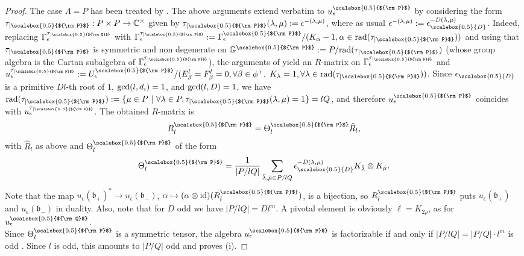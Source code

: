 \documentclass[11pt]{amsart}
\newcommand{\e}{\epsilon}
\newcommand{\mc}{\mathbb{C}}
\newcommand{\eD}{\epsilon_{\scalebox{0.5}{D}}}
\newcommand{\Q}{{\scalebox{0.5}{${\rm Q}$}}}
\newcommand{\Pup}{{\scalebox{0.5}{${\rm P}$}}}
\begin{document}
\begin{proof}
The case $\Lambda=P$ has been treated by \cite{LN,LO}. The above arguments extend verbatim to $u_\e^{\Pup}$ by considering the form $\tau_{\vert \Pup}:P \times P \to \mc^\times$ given by $\tau_{\vert \Pup}(\lambda,\mu) := \e^{-(\lambda, \mu)}$, where as usual $\e^{-(\lambda,\mu)} := \eD^{-D(\lambda,\mu)}$. Indeed, replacing $\Gamma_\e^{\tau_{\vert \Q}}$  with $\Gamma_\e^{\tau_{\vert \Pup}} := \Gamma_\e^\Pup/(K_\alpha-1,\alpha\in {\rm rad}(\tau_{\vert \Pup}))$ and using that $\tau_{\vert \Pup}$ is symmetric and non degenerate on $\mathbb{G}^\Pup:= P/{\rm rad}(\tau_{\vert \Pup})$ (whose group algebra is the Cartan subalgebra of $\Gamma_\e^{\tau_{\vert \Pup}}$), the arguments of \cite[Thm.\,A.1.6]{Lyub95} yield an $R$-matrix on $\Gamma_\e^{\tau_{\vert \Pup}}$ and $u_\e^{\tau_{\vert \Pup}} := U_\e^\Pup/(E_{\beta}^l=F_{\beta}^l=0, \forall \beta\in \phi^+, \;K_\lambda=1, \forall \lambda\in {\rm rad}(\tau_{\vert \Pup}))$. Since $\eD$ is a primitive $Dl$-th root of $1$, ${\rm gcd}(l,d_i)=1$, and ${\rm gcd}(l,D)=1$, we have ${\rm rad}(\tau_{\vert \Pup}) := \{\mu\in P\ \vert\  \forall \lambda\in P, \tau_{\vert \Pup}(\lambda,\mu)=1\}=lQ$, and therefore $u_\e^\Pup$ coincides with $u_\e^{\tau_{\vert \Pup}}$. The obtained $R$-matrix is
\begin{equation}\label{RmatlP}
R_l^\Pup = \Theta_l^\Pup \hat{R}_l,
\end{equation}
with $\hat{R}_l$ as above and $\Theta_l^\Pup$ of the form
$$\Theta_l^\Pup = \frac{1}{\vert P/lQ \vert}\sum_{\bar{\lambda},\bar{\mu}\in P/lQ} \eD^{-D(\lambda,\mu)} K_{\bar{\lambda}} \otimes K_{\bar{\mu}}.$$
Note that the map $u_\e(\mathfrak{b}_+)^*\to u_\e(\mathfrak{b}_-)$, $\alpha\mapsto (\alpha\otimes {\rm id})(R_l^\Pup)$, is a bijection, so $R_l^\Pup$ puts $u_\e(\mathfrak{b}_+)$ and $u_\e(\mathfrak{b}_-)$ in duality. Also, note that for $D$ odd we have $\vert P/lQ \vert =Dl^m$. A pivotal element is obviously $\ell=K_{2\rho}$, as for $u_\e^\Q$. \\
\indent Since $\Theta_l^\Pup$ is a symmetric tensor, the algebra $u_\e^\Pup$ is factorizable if and only if $\vert P/lQ \vert = \vert P/Q \vert\cdot l^m$ is odd \cite[Ex.\,5.11]{LO}. Since $l$ is odd, this amounts to $\vert P/Q \vert$ odd and proves (i).


\end{proof}
\end{document}
